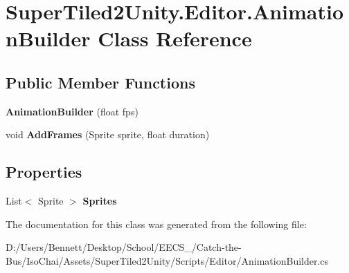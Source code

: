 \hypertarget{class_super_tiled2_unity_1_1_editor_1_1_animation_builder}{}\section{Super\+Tiled2\+Unity.\+Editor.\+Animation\+Builder Class Reference}
\label{class_super_tiled2_unity_1_1_editor_1_1_animation_builder}
\subsection*{Public Member Functions}
\begin{DoxyCompactItemize}
\item 
\mbox{\label{class_super_tiled2_unity_1_1_editor_1_1_animation_builder_a197195a5a44388c94fde61dbbc1077c9}} 
{\bfseries Animation\+Builder} (float fps)
\item 
\mbox{\label{class_super_tiled2_unity_1_1_editor_1_1_animation_builder_a83f1408ef7fa1a6712f6a972dead1846}} 
void {\bfseries Add\+Frames} (Sprite sprite, float duration)
\end{DoxyCompactItemize}
\subsection*{Properties}
\begin{DoxyCompactItemize}
\item 
\mbox{\label{class_super_tiled2_unity_1_1_editor_1_1_animation_builder_a0c14994a0a2d236740914cc037d72327}} 
List$<$ Sprite $>$ {\bfseries Sprites}
\end{DoxyCompactItemize}


The documentation for this class was generated from the following file\+:\begin{DoxyCompactItemize}
\item 
D\+:/\+Users/\+Bennett/\+Desktop/\+School/\+E\+E\+C\+S\+\_/\+Catch-\/the-\/\+Bus/\+Iso\+Chai/\+Assets/\+Super\+Tiled2\+Unity/\+Scripts/\+Editor/Animation\+Builder.\+cs\end{DoxyCompactItemize}
